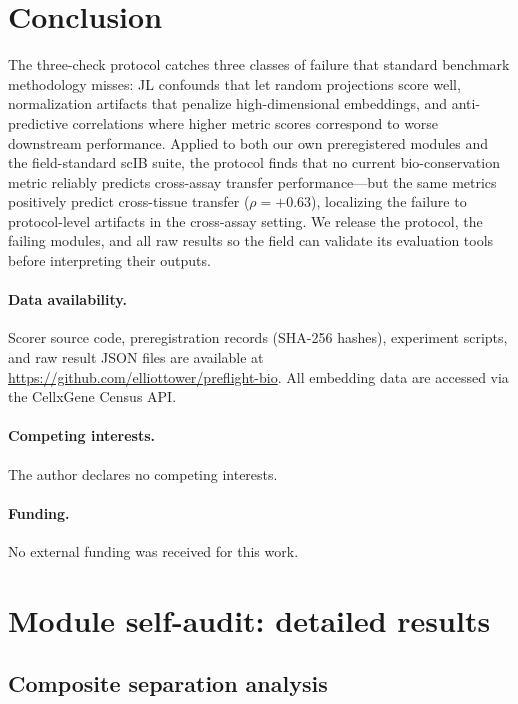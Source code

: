 \documentclass[10pt,letterpaper]{article}
\begin{document}
\section{Conclusion}

The three-check protocol catches three classes of failure that standard benchmark methodology misses: JL confounds that let random projections score well, normalization artifacts that penalize high-dimensional embeddings, and anti-predictive correlations where higher metric scores correspond to worse downstream performance. Applied to both our own preregistered modules and the field-standard scIB suite, the protocol finds that no current bio-conservation metric reliably predicts cross-assay transfer performance---but the same metrics positively predict cross-tissue transfer ($\rho = +0.63$), localizing the failure to protocol-level artifacts in the cross-assay setting. We release the protocol, the failing modules, and all raw results so the field can validate its evaluation tools before interpreting their outputs.

\paragraph{Data availability.} Scorer source code, preregistration records (SHA-256 hashes), experiment scripts, and raw result JSON files are available at \url{https://github.com/elliottower/preflight-bio}. All embedding data are accessed via the CellxGene Census API.

\paragraph{Competing interests.} The author declares no competing interests.

\paragraph{Funding.} No external funding was received for this work.


\appendix

\section{Module self-audit: detailed results}
\label{app:modules}

\subsection{Composite separation analysis}
\end{document}
